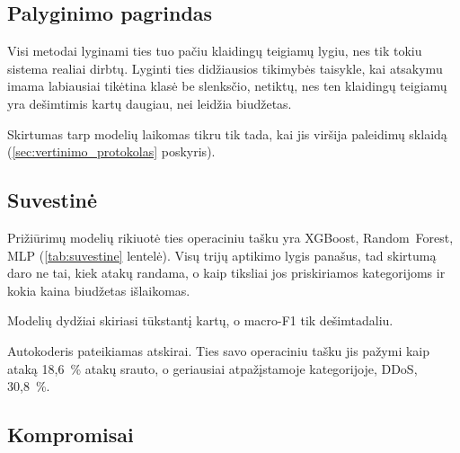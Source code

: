 
\subsection{Palyginimo pagrindas}
\label{sec:palyginimo_pagrindas}

Visi metodai lyginami ties tuo pačiu klaidingų teigiamų lygiu, nes tik
tokiu sistema realiai dirbtų. Lyginti ties didžiausios tikimybės
taisykle, kai atsakymu imama labiausiai tikėtina klasė be slenksčio,
netiktų, nes ten klaidingų teigiamų yra dešimtimis kartų daugiau, nei
leidžia biudžetas.

Skirtumas tarp modelių laikomas tikru tik tada, kai jis viršija
paleidimų sklaidą
(\ref{sec:vertinimo_protokolas} poskyris).


\subsection{Suvestinė}
\label{sec:suvestine}

\begin{table}[htbp]
\centering
\caption{Metodų palyginimas ties klaidingų teigiamų biudžetu.}
\label{tab:suvestine}
\end{table}

Prižiūrimų modelių rikiuotė ties operaciniu tašku yra XGBoost,
Random~Forest, MLP (\ref{tab:suvestine} lentelė). Visų trijų aptikimo
lygis panašus, tad skirtumą daro ne tai, kiek atakų randama, o kaip
tiksliai jos priskiriamos kategorijoms ir kokia kaina biudžetas
išlaikomas.

Modelių dydžiai skiriasi tūkstantį kartų, o macro-F1 tik dešimtadaliu.

Autokoderis pateikiamas atskirai. Ties savo operaciniu tašku jis pažymi
kaip ataką 18,6~\% atakų srauto, o geriausiai atpažįstamoje
kategorijoje, DDoS, 30,8~\%.


\subsection{Kompromisai}
\label{sec:kompromisai}

